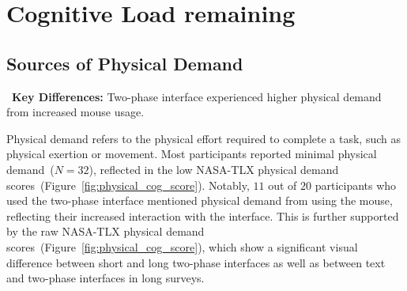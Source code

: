 \appendix

\section{Cognitive Load remaining}
\subsection{Sources of Physical Demand} 
\label{sec:physical}

\begin{tldrbox}
   \faKey~\textbf{Key Differences:} Two-phase interface experienced higher physical demand from increased mouse usage.
\end{tldrbox}


Physical demand refers to the physical effort required to complete a task, such as physical exertion or movement. Most participants reported minimal physical demand~($N=32$), reflected in the low NASA-TLX physical demand scores~(Figure~\ref{fig:physical_cog_score}). Notably, $11$ out of $20$ participants who used the two-phase interface mentioned physical demand from using the mouse, reflecting their increased interaction with the interface. This is further supported by the raw NASA-TLX physical demand scores~(Figure~\ref{fig:physical_cog_score}), which show a significant visual difference between short and long two-phase interfaces as well as between text and two-phase interfaces in long surveys.


